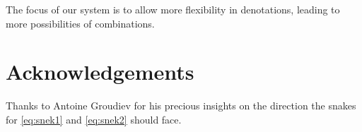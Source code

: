 \documentclass[math, english, info]{cours}
\begin{document}
The focus of our system is to allow more flexibility in denotations, leading to more
possibilities of combinations.









\section*{Acknowledgements}
Thanks to Antoine Groudiev for his precious insights on the direction the snakes for \eqref{eq:snek1} and \eqref{eq:snek2} should face.
\clearpage
\appendix




\end{document}
